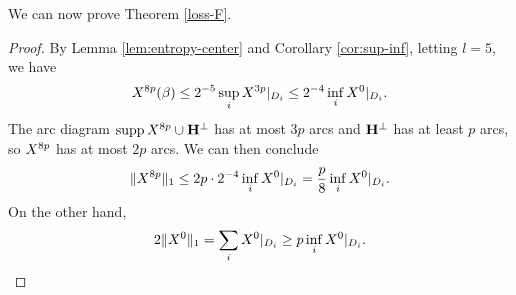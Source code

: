 We can now prove Theorem \ref{loss-F}.
\begin{proof}
By Lemma \ref{lem:entropy-center} and Corollary \ref{cor:sup-inf},
letting $l = 5$, 
we have 
$$
X^{8p}(\beta) \le  2^{-5} \sup_i X^{3p}|_{D_i} \le 2^{-4}\inf_i X^{0}|_{D_i}.
$$
The arc diagram $\operatorname{supp} X^{8p} \cup {\mathbf{H}}^\perp$ has at most $3p$ arcs and ${\mathbf{H}}^\perp$ has at least $p$ arcs,
so $X^{8p}$ has at most $2p$ arcs. 
We can then conclude
$$
\Vert X^{8p} \Vert_1 \le 2p \cdot 2^{-4} \inf_i X^{0}|_{D_i} = \frac p 8 \inf_i X^{0}|_{D_i}.
$$
On the other hand, 
$$
2\Vert X^{0} \Vert_1 = \sum_i X^{0}|_{D_i} \ge p \inf_i X^{0}|_{D_i}. \qedhere
$$
\end{proof}


